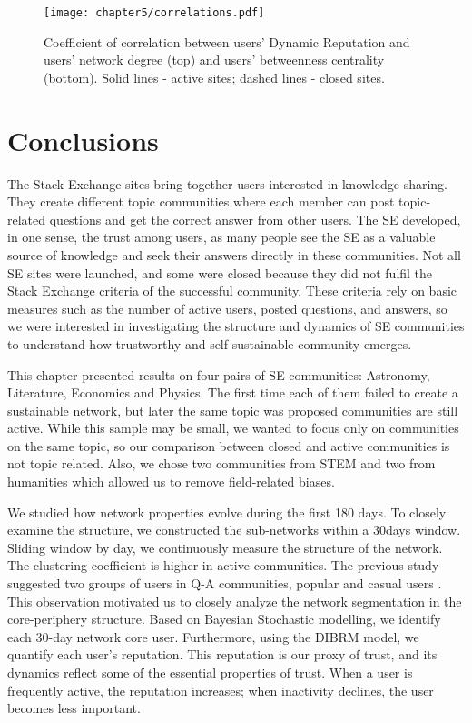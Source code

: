 \begin{figure}[h]
	\centering
	\texttt{[image: chapter5/correlations.pdf]}
	\caption[Coefficient correlation between ]{Coefficient of correlation between users’ Dynamic Reputation and users’ network degree (top) and users’ betweenness centrality (bottom). Solid lines - active sites; dashed lines - closed sites.}
	\label{fig:dyn_rep_centrality}
\end{figure}

\newpage
\section{Conclusions}

The Stack Exchange sites bring together users interested in knowledge sharing. They create different topic communities where each member can post topic-related questions and get the correct answer from other users. The SE developed, in one sense, the trust among users, as many people see the SE as a valuable source of knowledge and seek their answers directly in these communities. Not all SE sites were launched, and some were closed because they did not fulfil the Stack Exchange criteria of the successful community. These criteria rely on basic measures such as the number of active users, posted questions, and answers, so we were interested in investigating the structure and dynamics of SE communities to understand how trustworthy and self-sustainable community emerges. 

This chapter presented results on four pairs of SE communities: Astronomy, Literature, Economics and Physics. The first time each of them failed to create a sustainable network, but later the same topic was proposed communities are still active. While this sample may be small, we wanted to focus only on communities on the same topic, so our comparison between closed and active communities is not topic related. Also, we chose two communities from STEM and two from humanities which allowed us to remove field-related biases. 

We studied how network properties evolve during the first 180 days. To closely examine the structure, we constructed the sub-networks within a 30days window. Sliding window by day, we continuously measure the structure of the network. The clustering coefficient is higher in active communities. The previous study suggested two groups of users in Q-A communities, popular and casual users \cite{santos2019self}. This observation motivated us to closely analyze the network segmentation in the core-periphery structure. Based on Bayesian Stochastic modelling, we identify each 30-day network core user.
Furthermore, using the DIBRM model\cite{melnikov2018toward}, we quantify each user's reputation. This reputation is our proxy of trust, and its dynamics reflect some of the essential properties of trust. When a user is frequently active, the reputation increases; when inactivity declines, the user becomes less important.   

